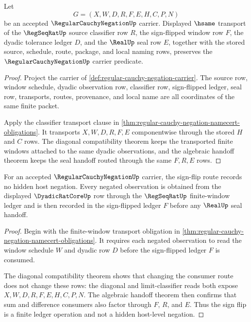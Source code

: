 \begin{theorem}
\label{thm:regular-cauchy-negation-carrier-transport}
Let
$$
G=(X,W,D,R,F,E,H,C,P,N)
$$
be an accepted $\RegularCauchyNegationUp$ carrier. Displayed $\hsame$ transport of the $\RegSeqRatUp$ source classifier row $R$, the sign-flipped window row $F$, the dyadic tolerance ledger $D$, and the $\RealUp$ seal row $E$, together with the stored source, schedule, route, package, and local naming rows, preserves the $\RegularCauchyNegationUp$ carrier predicate.
\end{theorem}
\begin{proof}
Project the carrier of \autoref{def:regular-cauchy-negation-carrier}. The source row, window schedule, dyadic observation row, classifier row, sign-flipped ledger, seal row, transports, routes, provenance, and local name are all coordinates of the same finite packet.

Apply the classifier transport clause in \autoref{thm:regular-cauchy-negation-namecert-obligations}. It transports $X,W,D,R,F,E$ componentwise through the stored $H$ and $C$ rows. The diagonal compatibility theorem keeps the transported finite windows attached to the same dyadic observations, and the algebraic handoff theorem keeps the seal handoff routed through the same $F,R,E$ rows.
\end{proof}

\begin{theorem}
\label{thm:regular-cauchy-negation-sign-flip-ledger}
For an accepted $\RegularCauchyNegationUp$ carrier, the sign-flip route records no hidden host negation. Every negated observation is obtained from the displayed $\DyadicRatCoreUp$ row through the $\RegSeqRatUp$ finite-window ledger and is then recorded in the sign-flipped ledger $F$ before any $\RealUp$ seal handoff.
\end{theorem}
\begin{proof}
Begin with the finite-window transport obligation in \autoref{thm:regular-cauchy-negation-namecert-obligations}. It requires each negated observation to read the window schedule $W$ and dyadic row $D$ before the sign-flipped ledger $F$ is consumed.

The diagonal compatibility theorem shows that changing the consumer route does not change these rows: the diagonal and limit-classifier reads both expose $X,W,D,R,F,E,H,C,P,N$. The algebraic handoff theorem then confirms that sum and difference consumers also factor through $F$, $R$, and $E$. Thus the sign flip is a finite ledger operation and not a hidden host-level negation.
\end{proof}

